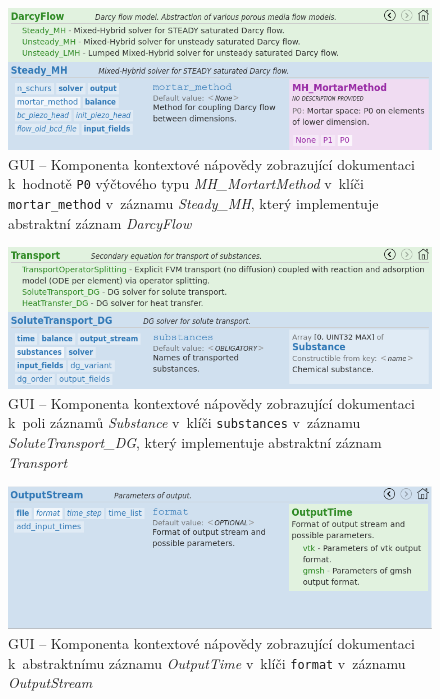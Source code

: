 \documentclass[FM,bw,DP]{tulthesis}
\begin{document}
\clearpage

\begin{figure}[h!]
	\centering
    \includegraphics[width=\textwidth]{../img/screenshots/gui_doc_mortar_method.png}
    \caption[GUI -- Kontextová nápověda pro záznam \textit{Steady\_MH}]{GUI -- Komponenta kontextové nápovědy zobrazující dokumentaci k~hodnotě \texttt{P0} výčtového typu \textit{MH\_MortartMethod} v~klíči \texttt{mortar\_method} v~záznamu \textit{Steady\_MH}, který implementuje abstraktní záznam \textit{DarcyFlow}}
	\label{img:gui_doc_mortar_method}
\end{figure}

\begin{figure}[h!]
	\centering
    \includegraphics[width=\textwidth]{../img/screenshots/gui_doc_substances.png}
    \caption[GUI -- Kontextová nápověda pro záznam \textit{SoluteTransport\_DG}]{GUI -- Komponenta kontextové nápovědy zobrazující dokumentaci k~poli záznamů \textit{Substance} v~klíči \texttt{substances} v~záznamu \textit{SoluteTransport\_DG}, který implementuje abstraktní záznam \textit{Transport}}
	\label{img:gui_doc_substances}
\end{figure}

\begin{figure}[h!]
	\centering
    \includegraphics[width=\textwidth]{../img/screenshots/gui_doc_format.png}
    \caption[GUI -- Kontextová nápověda pro záznam \textit{OutputStream}]{GUI -- Komponenta kontextové nápovědy zobrazující dokumentaci k~abstraktnímu záznamu \textit{OutputTime} v~klíči \texttt{format} v~záznamu \textit{OutputStream}}
	\label{img:gui_doc_format}
\end{figure}

\clearpage
\end{document}

